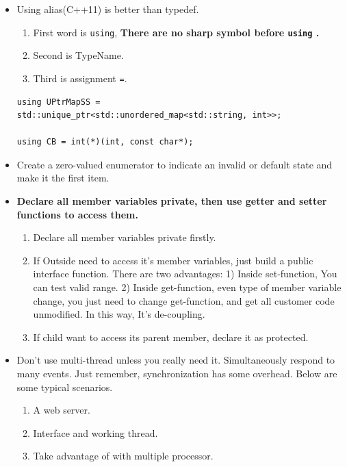 \documentclass[a4paper,11pt,twoside]{book}
\begin{document}
\begin{itemize}
	\item Using alias(C++11) is better than typedef. 
	\begin{enumerate}
		\item First word is \texttt{using}, \textbf{There are no sharp symbol before \texttt{using} .} 
		\item Second is TypeName. 
		\item Third is assignment \texttt{=}.  
	\end{enumerate}
	
\begin{lstlisting}[numbers=none]
using UPtrMapSS =
std::unique_ptr<std::unordered_map<std::string, int>>;

using CB = int(*)(int, const char*);
\end{lstlisting}
	
	\item Create a zero-valued enumerator to indicate an invalid or default state and make it the first item.
	
	\item \textbf{Declare all member variables private, then use getter and setter functions to access them.}
	\begin{enumerate}
		\item Declare all member variables private firstly.
		
		\item If Outside need to access it's member variables, just build a public interface function. There are two advantages: 1) Inside set-function, You can test valid range. 2) Inside get-function, even type of member variable change, you just need to change get-function, and get all customer code unmodified. In this way, It's de-coupling.
		
		\item If child want to access its parent member, declare it as protected.
		
	\end{enumerate}
	
	\item Don't use multi-thread unless you really need it. Simultaneously respond to many events. Just remember, synchronization has some overhead. Below are some typical scenarios.
	\begin{enumerate}
		\item A web server.
		\item Interface and working thread.
		\item Take advantage of with multiple processor.
	\end{enumerate}
	

\end{itemize}
\end{document}
